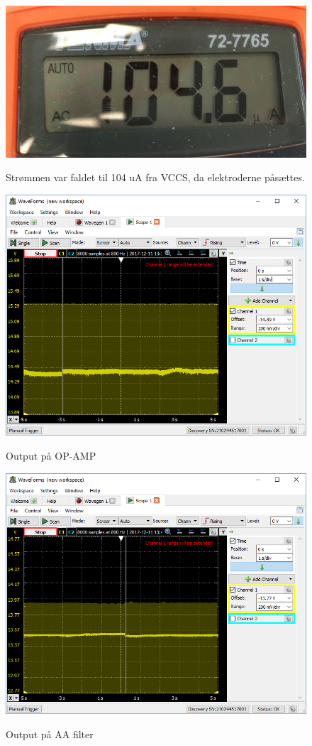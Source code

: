\begin{figure}[H] 
\centering
{\includegraphics[width=12cm]
{Figure/integrationstestINA2udstrom}}
\caption{Strømmen var faldet til 104 uA fra VCCS, da elektroderne påsættes.}
\label{fig:integrationstestINA2udstrom}
\end{figure}

\begin{figure}[H] 
\centering
{\includegraphics[width=12cm]
{Figure/integrationstestOPAMPud}}
\caption{Output på OP-AMP}
\label{fig:integrationstestOPAMPud}
\end{figure}


\begin{figure}[H] 
\centering
{\includegraphics[width=12cm]
{Figure/integrationstestAAud}}
\caption{Output på AA filter}
\label{fig:integrationstestAAud}
\end{figure}

